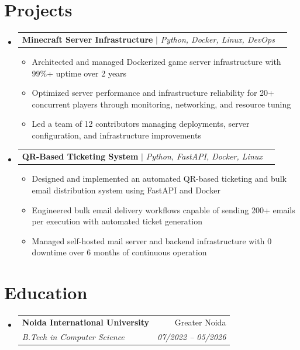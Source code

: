 \documentclass[letterpaper,11pt]{article}
\makeatletter
\newcommand{\resumeItem}[1]{
  \item\small{
    {#1 \vspace{-2pt}}
  }
}
\newcommand{\resumeSubheading}[4]{
  \vspace{-2pt}\item
    \begin{tabular*}{0.97\textwidth}[t]{l@{\extracolsep{\fill}}r}
      \textbf{#1} & #2 \\
      \textit{\small#3} & \textit{\small #4} \\
    \end{tabular*}\vspace{-7pt}
}
\newcommand{\resumeProjectHeading}[2]{
    \item
    \begin{tabular*}{0.97\textwidth}{l@{\extracolsep{\fill}}r}
      \small#1 & #2 \\
    \end{tabular*}\vspace{-7pt}
}
\newcommand{\resumeSubHeadingListStart}{\begin{itemize}[leftmargin=0.15in, label={}]}
\newcommand{\resumeSubHeadingListEnd}{\end{itemize}}
\newcommand{\resumeItemListStart}{\begin{itemize}}
\newcommand{\resumeItemListEnd}{\end{itemize}\vspace{-5pt}}
\makeatother
\begin{document}
\section{Projects}
    \resumeSubHeadingListStart
      \resumeProjectHeading
          {\textbf{Minecraft Server Infrastructure} $|$ \emph{Python, Docker, Linux, DevOps}}{}
          \resumeItemListStart
            \resumeItem{Architected and managed Dockerized game server infrastructure with 99\%+ uptime over 2 years}
            \resumeItem{Optimized server performance and infrastructure reliability for 20+ concurrent players through monitoring, networking, and resource tuning}
            \resumeItem{Led a team of 12 contributors managing deployments, server configuration, and infrastructure improvements}
          \resumeItemListEnd
      \resumeProjectHeading
          {\textbf{QR-Based Ticketing System} $|$ \emph{Python, FastAPI, Docker, Linux}}{}
          \resumeItemListStart
            \resumeItem{Designed and implemented an automated QR-based ticketing and bulk email distribution system using FastAPI and Docker}
            \resumeItem{Engineered bulk email delivery workflows capable of sending 200+ emails per execution with automated ticket generation}
            \resumeItem{Managed self-hosted mail server and backend infrastructure with 0 downtime over 6 months of continuous operation}
          \resumeItemListEnd
    \resumeSubHeadingListEnd

\section{Education}
  \resumeSubHeadingListStart
    \resumeSubheading
      {Noida International University}{Greater Noida}
      {B.Tech in Computer Science}{07/2022 – 05/2026}
  \resumeSubHeadingListEnd





\end{document}

